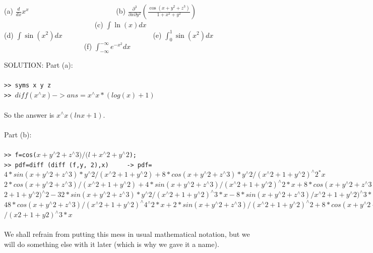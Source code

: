 \documentclass[../main.tex]{subfiles}
\begin{document}
\begin{center}
(a) $\frac{d}{d x} x^{x}$~~~~~~~~~~~~~~~~~~~~~~~~
(b) $\frac{\partial^{3}}{\partial x \partial y^{2}}\left(\frac{\cos \left(x+y^{2}+z^{3}\right)}{1+x^{2}+y^{2}}\right)$~~~~~~~~~~~~~~~~~~~~~~~~~
(c) $\int \ln (x) d x$\\
(d) $\int \sin \left(x^{2}\right) d x$~~~~~~~~~~~~~~~~~~~~~~~~~
(e) $\int_{0}^{1} \sin \left(x^{2}\right) d x$~~~~~~~~~~~~~~~~~~~~~~
(f) $\int_{-\infty}^{-\infty} e^{-x^{2}} d x$\\
\end{center}
SOLUTION: Part (a): 
\\
\\
\texttt{>> syms x y z }\\
\texttt{>> $diff(x^{\wedge}x ) ->ans=x^{\wedge}x*(log(x)+1)$ }
\\
\\
So the answer is $x^{\wedge}x(lnx+1).$ 
\\
\\
Part (b): 
\\
\\
\texttt{>> f=cos($x+y^{\wedge}2+z^{\wedge}3)/ (l+x^{\wedge}2+y^{\wedge}2$); }\\
\texttt{>> pdf=diff (diff (f,y, 2),x) ~~~ -> pdf= }\\
\texttt{$4*sin(x+y^{\wedge}2+z^{\wedge}3)*y^{\wedge}
2/(x^{\wedge}
2+1+y^{\wedge}
2)+8*cos(x+y^{\wedge}
2+z^{\wedge}
3)*y^{\wedge}
2/(x^{\wedge}
2+1+y^{\wedge}
2)^{\wedge}
2^{*}x$}\\
\texttt{$2*cos(x+y^{\wedge}
2+z^{\wedge}
3)/(x^{\wedge}
2+1+y^{\wedge}
2)+4*sin(x+y^{\wedge}
2+z^{\wedge}
3)/(x^{\wedge}
2+1+y^{\wedge}
2)^{\wedge}
2*x+8*cos(x+y^{\wedge}
2+z^{\wedge}
3)y^{\wedge}2/(x^{\wedge} $}\\
\texttt{$2+1+y^{\wedge}2)^{\wedge}2-32*sin(x+y^{\wedge}2+z^{\wedge}3)*y^{\wedge}2/(x^{\wedge}2+1+y^{\wedge}2)^{\wedge}3*x-8*sin(x+y^{\wedge}2+z^{\wedge}3)/x^{\wedge}2+1+y^{\wedge}2)^{\wedge}3*y^{\wedge}2- $}\\
\texttt{$48*cos(x+y^{\wedge}
2+z^{\wedge}
3)/(x^{\wedge}
2+1+y^{\wedge}
2)^{\wedge}
4^{\wedge}2*x+2*sin(x+y^{\wedge}
2+z^{\wedge}
3)/(x^{\wedge}
2+1+y^{\wedge}
2)^{\wedge}
2+8*cos(x+y^{\wedge}
2+z^{\wedge}3)$}
\texttt{$/(x 2+1+y 2)^{\wedge}3*x $}
\\
\\
We shall refrain from putting this mess in usual mathematical notation, but we will 
do something else with it later (which is why we gave it a name). 
\\
\end{document}
